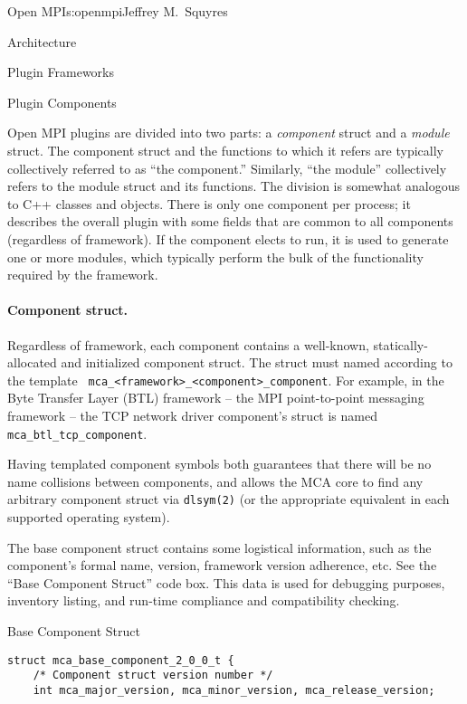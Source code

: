 \begin{aosachapter}{Open MPI}{s:openmpi}{Jeffrey M.\ Squyres}
\begin{aosasect1}{Architecture}
\begin{aosasect2}{Plugin Frameworks}
\end{aosasect2}


\begin{aosasect2}{Plugin Components}

Open MPI plugins are divided into two parts: a {\em component}
struct and a {\em module} struct.
%
The component struct and the functions to which it refers are
typically collectively referred to as ``the component.''  Similarly,
``the module'' collectively refers to the module struct and its
functions.
%
The division is somewhat analogous to C++ classes and objects.
%
There is only one component per process; it describes the overall
plugin with some fields that are common to all components (regardless
of framework).
%
If the component elects to run, it is used to generate one or more
modules, which typically perform the bulk of the functionality
required by the framework.


\paragraph{Component struct.} 

Regardless of framework, each component contains a well-known,
statically-allocated and initialized component struct.  
%
The struct must named according to the template {\tt
  mca\_\-<framework>\_\-<component>\_\-component}.  For example, in
the Byte Transfer Layer (BTL) framework -- the MPI point-to-point
messaging framework -- the TCP network driver component's struct is
named {\tt mca\_\-btl\_\-tcp\_\-component}.

Having templated component symbols both guarantees that there will be
no name collisions between components, and allows the MCA core to find
any arbitrary component struct via {\tt dlsym(2)} (or the appropriate
equivalent in each supported operating system).

The base component struct contains some logistical information, such
as the component's formal name, version, framework version adherence,
etc.  See the ``Base Component Struct'' code box.
%
This data is used for debugging purposes, inventory listing, and
run-time compliance and compatibility checking.

\begin{aosabox}{Base Component Struct}
\begin{verbatim}
struct mca_base_component_2_0_0_t {
    /* Component struct version number */
    int mca_major_version, mca_minor_version, mca_release_version;


\end{verbatim}
\end{aosabox}
\end{aosasect2}
\end{aosasect1}
\end{aosachapter}
